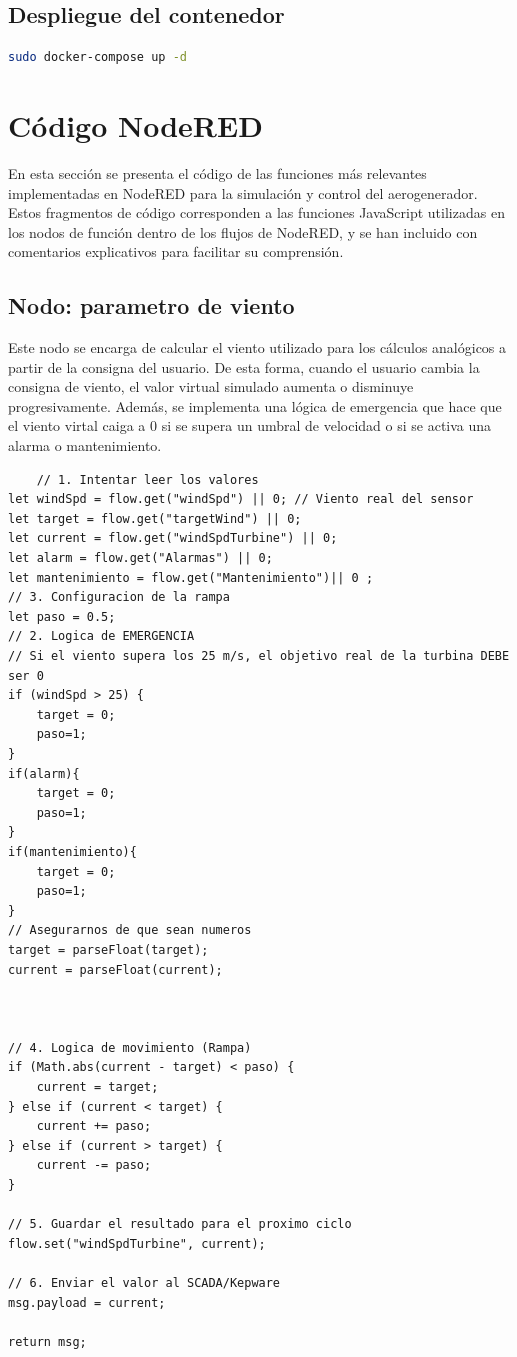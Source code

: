 \subsection{Despliegue del contenedor}
\begin{lstlisting}[language=bash]
sudo docker-compose up -d
\end{lstlisting}
\section{Código NodeRED}

En esta sección se presenta el código de las funciones más relevantes implementadas en NodeRED para la simulación y control del aerogenerador. Estos fragmentos de código corresponden a las funciones JavaScript utilizadas en los nodos de función dentro de los flujos de NodeRED, y se han incluido con comentarios explicativos para facilitar su comprensión.
\subsection{Nodo: parametro de viento}
Este nodo se encarga de calcular el viento utilizado para los cálculos analógicos a partir de la consigna del usuario. De esta forma, cuando el usuario cambia la consigna de viento, el valor virtual simulado aumenta o disminuye progresivamente. Además, se implementa una lógica de emergencia que hace que el viento virtal caiga a 0 si se supera un umbral de velocidad o si se activa una alarma o mantenimiento.
\begin{lstlisting}
    // 1. Intentar leer los valores
let windSpd = flow.get("windSpd") || 0; // Viento real del sensor
let target = flow.get("targetWind") || 0;
let current = flow.get("windSpdTurbine") || 0;
let alarm = flow.get("Alarmas") || 0;
let mantenimiento = flow.get("Mantenimiento")|| 0 ;
// 3. Configuracion de la rampa
let paso = 0.5; 
// 2. Logica de EMERGENCIA
// Si el viento supera los 25 m/s, el objetivo real de la turbina DEBE ser 0
if (windSpd > 25) {
    target = 0;
    paso=1;
}
if(alarm){
    target = 0;
    paso=1;
}
if(mantenimiento){
    target = 0;
    paso=1;
}
// Asegurarnos de que sean numeros
target = parseFloat(target);
current = parseFloat(current);



// 4. Logica de movimiento (Rampa)
if (Math.abs(current - target) < paso) {
    current = target;
} else if (current < target) {
    current += paso;
} else if (current > target) {
    current -= paso;
}

// 5. Guardar el resultado para el proximo ciclo
flow.set("windSpdTurbine", current);

// 6. Enviar el valor al SCADA/Kepware
msg.payload = current;

return msg;
\end{lstlisting}
